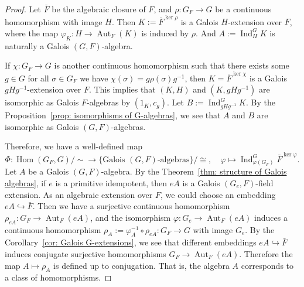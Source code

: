 \documentclass[10pt,a4paper]{amsart}
\begin{document}
	\begin{proof}
		Let $\bar{F}$ be the algebraic closure of $F$, and $\rho:G_F\to G$ be a continuous homomorphism with image $H$.
		Then $K:=\bar{F}^{\ker\rho}$ is a Galois $H$-extension over $F$, where the map $\varphi_K:H\to\operatorname{Aut}_F(K)$ is induced by $\rho$.
		And $A:=\operatorname{Ind}^G_H K$ is naturally a Galois $(G,F)$-algebra.
		
		If $\chi:G_F\to G$ is another continuous homomorphism such that there exists some $g\in G$ for all $\sigma\in G_F$ we have $\chi(\sigma)=g\rho(\sigma)g^{-1}$, then $K=\bar{F}^{\ker\chi}$ is a Galois $gHg^{-1}$-extension over $F$.
		This implies that $(K,H)$ and $(K,gHg^{-1})$ are isomorphic as Galois $F$-algebras by $(1_K,c_g)$.
		Let $B:=\operatorname{Ind}^G_{gHg^{-1}}K$.
		By the Proposition~\ref{prop: isomorphisms of G-algebras}, we see that $A$ and $B$ are isomorphic as Galois $(G,F)$-algebras.
		
		Therefore, we have a well-defined map
		\begin{equation*}
			\Phi:\operatorname{Hom}(G_F,G)/\sim\to\{\text{Galois }(G,F)\text{-algebras}\}/\cong,\quad\varphi\mapsto\operatorname{Ind}^G_{\varphi(G_F)}\bar{F}^{\ker\varphi}.
		\end{equation*} 
		Let $A$ be a Galois $(G,F)$-algebra.
		By the Theorem~\ref{thm: structure of Galois algebras}, if $e$ is a primitive idempotent, then $eA$ is a Galois $(G_e,F)$-field extension.
		As an algebraic extension over $F$, we could choose an embedding $eA\hookrightarrow\bar{F}$.
		Then we have a surjective continuous homomorphism $\rho_{eA}:G_F\to\operatorname{Aut}_F(eA)$,
		and the isomorphism $\varphi:G_e\to\operatorname{Aut}_F(eA)$ induces a continuous homomorphism $\rho_A:=\varphi_A^{-1}\circ\rho_{eA}:G_F\to G$ with image $G_e$.
		By the Corollary~\ref{cor: Galois G-extensions}, we see that different embeddings $eA\hookrightarrow\bar{F}$ induces conjugate surjective homomorphisms $G_F\to\operatorname{Aut}_F(eA)$.
		Therefore the map $A\mapsto\rho_A$ is defined up to conjugation.
		That is, the algebra $A$ corresponds to a class of homomorphisms.
		

\end{proof}
\end{document}
